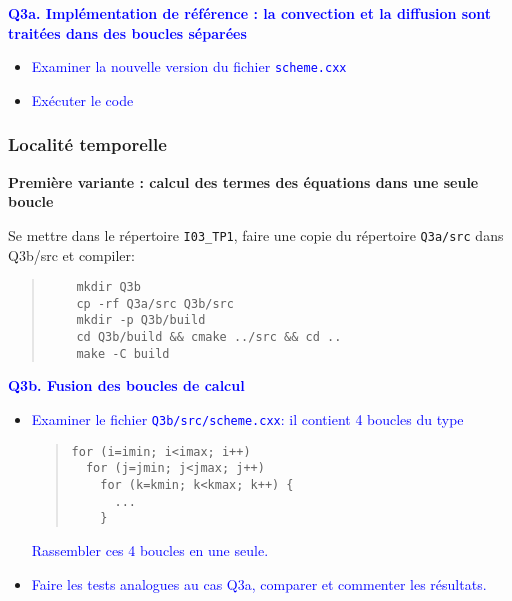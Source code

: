 \documentclass{beamer}
\begin{document}
\begin{frame}
\vfill
\textcolor{blue}{\bf Q3a. Impl\'ementation de r\'ef\'erence : la convection et la diffusion sont trait\'ees dans des boucles s\'epar\'ees}

\begin{itemize}
	\item \textcolor{blue}{Examiner la nouvelle version du fichier {\tt scheme.cxx}}
	\item \textcolor{blue}{Ex\'ecuter le code}
\end{itemize}

\end{frame}

\begin{frame}[fragile]
\frametitle{Localit\'e temporelle}
\vfill
{\bf Premi\`ere variante : calcul des termes des \'equations dans une seule boucle}

\vfill

Se mettre dans le r\'epertoire {\tt I03\_TP1}, faire une copie du r\'epertoire {\tt Q3a/src} dans {Q3b/src} et compiler:
\begin{quote}
	\begin{verbatim}
	mkdir Q3b
	cp -rf Q3a/src Q3b/src
	mkdir -p Q3b/build
	cd Q3b/build && cmake ../src && cd ..
	make -C build
	\end{verbatim}
\end{quote}

\end{frame}

\begin{frame}[fragile]
	
\textcolor{blue}{\bf Q3b. Fusion des boucles de calcul}
 \begin{itemize}
	\item \textcolor{blue}{Examiner le fichier {\tt Q3b/src/scheme.cxx}: il contient 4 boucles du type}
		\begin{quote}
\begin{lstlisting}
for (i=imin; i<imax; i++)
  for (j=jmin; j<jmax; j++)
    for (k=kmin; k<kmax; k++) {
	  ...
	}
\end{lstlisting}
		\end{quote}
	\textcolor{blue}{Rassembler ces 4 boucles en une seule.}
	\item \textcolor{blue}{Faire les tests analogues au cas Q3a, comparer et commenter les r\'esultats.}
\end{itemize}

\end{frame}
\end{document}
